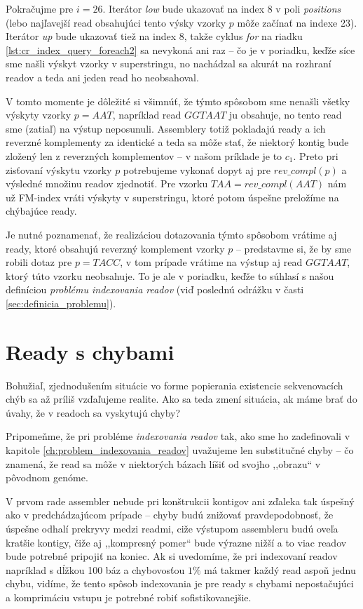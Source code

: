 \begin{example}
Pokračujme pre $i=26$. Iterátor \emph{low} bude ukazovať na index 8 v poli \emph{positions} (lebo najľavejší read obsahujúci tento výsky vzorky $p$ môže začínať na indexe 23). Iterátor \emph{up} bude ukazovať tiež na index 8, takže cyklus \emph{for} na riadku \ref{lst:cr_index_query_foreach2} sa nevykoná ani raz -- čo je v poriadku, keďže síce sme našli výskyt vzorky v superstringu, no nachádzal sa akurát na rozhraní readov a teda ani jeden read ho neobsahoval.

V tomto momente je dôležité si všimnúť, že týmto spôsobom sme nenašli všetky výskyty vzorky $p=AAT$, napríklad read $GGTAAT$ ju obsahuje, no tento read sme (zatiaľ) na výstup neposunuli. Assemblery totiž pokladajú ready a ich reverzné komplementy za identické a teda sa môže stať, že niektorý kontig bude zložený len z reverzných komplementov -- v našom príklade je to $c_1$. Preto pri zisťovaní výskytu vzorky $p$ potrebujeme vykonať dopyt aj pre $rev\_compl(p)$ a výsledné množinu readov zjednotiť. Pre vzorku $TAA = rev\_compl(AAT)$ nám už FM-index vráti výskyty v superstringu, ktoré potom úspešne preložíme na chýbajúce ready.

Je nutné poznamenať, že realizáciou dotazovania týmto spôsobom vrátime aj ready, ktoré obsahujú reverzný komplement vzorky $p$ -- predstavme si, že by sme robili dotaz pre $p=TACC$, v tom prípade vrátime na výstup aj read $GGTAAT$, ktorý túto vzorku neobsahuje. To je ale v poriadku, keďže to súhlasí s našou definíciou \emph{problému indexovania readov} (viď poslednú odrážku v časti \ref{sec:definicia_problemu}).

\end{example}

\section{Ready s chybami}
\label{sec:ready_s_chybami}
Bohužiaľ, zjednodušením situácie vo forme popierania existencie sekvenovacích chýb sa až príliš vzďaľujeme realite. Ako sa teda zmení situácia, ak máme brať do úvahy, že v readoch sa vyskytujú chyby?

Pripomeňme, že pri probléme \emph{indexovania readov} tak, ako sme ho zadefinovali v kapitole \ref{ch:problem_indexovania_readov} uvažujeme len substitučné chyby -- čo znamená, že read sa môže v niektorých bázach líšiť od svojho ,,obrazu`` v pôvodnom genóme.

V prvom rade assembler nebude pri konštrukcii kontigov ani zďaleka tak úspešný ako v predchádzajúcom prípade -- chyby budú znižovať pravdepodobnosť, že úspešne odhalí prekryvy medzi readmi, ciže výstupom assembleru budú oveľa kratšie kontigy, čiže aj ,,kompresný pomer`` bude výrazne nižší a to viac readov bude potrebné pripojiť na koniec. Ak si uvedomíme, že pri indexovaní readov napríklad s dĺžkou 100 báz a chybovosťou $1\%$ má takmer každý read aspoň jednu chybu, vidíme, že tento spôsob indexovania je pre ready s chybami nepostačujúci a komprimáciu vstupu je potrebné robiť sofistikovanejšie.

